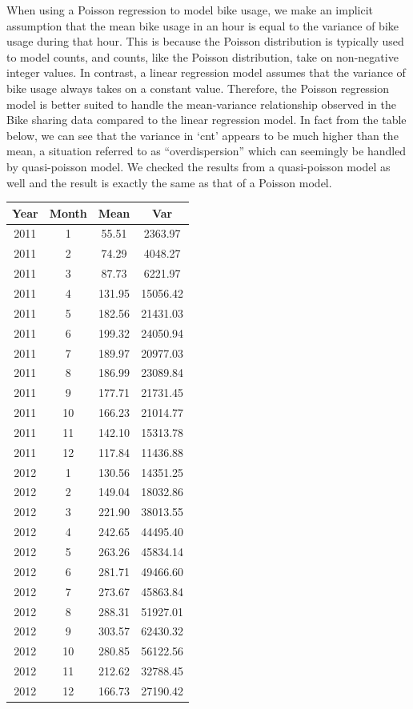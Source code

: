 \documentclass[
]{article}
\begin{document}
When using a Poisson regression to model bike usage, we make an implicit
assumption that the mean bike usage in an hour is equal to the variance
of bike usage during that hour. This is because the Poisson distribution
is typically used to model counts, and counts, like the Poisson
distribution, take on non-negative integer values. In contrast, a linear
regression model assumes that the variance of bike usage always takes on
a constant value. Therefore, the Poisson regression model is better
suited to handle the mean-variance relationship observed in the Bike
sharing data compared to the linear regression model. In fact from the
table below, we can see that the variance in `cnt' appears to be much
higher than the mean, a situation referred to as ``overdispersion''
which can seemingly be handled by quasi-poisson model. We checked the
results from a quasi-poisson model as well and the result is exactly the
same as that of a Poisson model.

\begin{table}
\centering
\begin{tabular}{c|c|c|c}
\hline
Year & Month & Mean & Var\\
\hline
2011 & 1 & 55.51 & 2363.97\\
\hline
2011 & 2 & 74.29 & 4048.27\\
\hline
2011 & 3 & 87.73 & 6221.97\\
\hline
2011 & 4 & 131.95 & 15056.42\\
\hline
2011 & 5 & 182.56 & 21431.03\\
\hline
2011 & 6 & 199.32 & 24050.94\\
\hline
2011 & 7 & 189.97 & 20977.03\\
\hline
2011 & 8 & 186.99 & 23089.84\\
\hline
2011 & 9 & 177.71 & 21731.45\\
\hline
2011 & 10 & 166.23 & 21014.77\\
\hline
2011 & 11 & 142.10 & 15313.78\\
\hline
2011 & 12 & 117.84 & 11436.88\\
\hline
2012 & 1 & 130.56 & 14351.25\\
\hline
2012 & 2 & 149.04 & 18032.86\\
\hline
2012 & 3 & 221.90 & 38013.55\\
\hline
2012 & 4 & 242.65 & 44495.40\\
\hline
2012 & 5 & 263.26 & 45834.14\\
\hline
2012 & 6 & 281.71 & 49466.60\\
\hline
2012 & 7 & 273.67 & 45863.84\\
\hline
2012 & 8 & 288.31 & 51927.01\\
\hline
2012 & 9 & 303.57 & 62430.32\\
\hline
2012 & 10 & 280.85 & 56122.56\\
\hline
2012 & 11 & 212.62 & 32788.45\\
\hline
2012 & 12 & 166.73 & 27190.42\\
\hline
\end{tabular}
\end{table}
\end{document}
